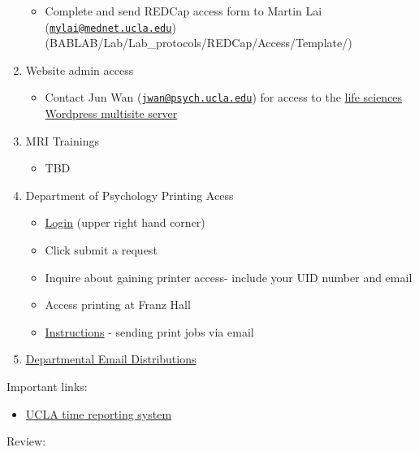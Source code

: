 \documentclass[]{book}
\providecommand{\tightlist}{%
  \setlength{\itemsep}{0pt}\setlength{\parskip}{0pt}}
\begin{document}
\begin{enumerate}
  \begin{itemize}
  \tightlist
  \item
    Complete and send REDCap access form to Martin Lai
    (\href{mailto:mylai@mednet.ucla.edu}{\nolinkurl{mylai@mednet.ucla.edu}})
    (BABLAB/Lab/Lab\_protocols/REDCap/Access/Template/)
  \end{itemize}
\item
  Website admin access

  \begin{itemize}
  \tightlist
  \item
    Contact Jun Wan
    (\href{mailto:jwan@psych.ucla.edu}{\nolinkurl{jwan@psych.ucla.edu}})
    for access to the \href{https://sites.lifesci.ucla.edu/}{life
    sciences Wordpress multisite server}
  \end{itemize}
\item
  MRI Trainings

  \begin{itemize}
  \tightlist
  \item
    TBD
  \end{itemize}
\item
  Department of Psychology Printing Acess

  \begin{itemize}
  \tightlist
  \item
    \href{https://support.lifesci.ucla.edu/hc/en-us}{Login} (upper right
    hand corner)
  \item
    Click submit a request
  \item
    Inquire about gaining printer access- include your UID number and
    email
  \item
    Access printing at Franz Hall
  \item
    \href{https://ucla.app.box.com/s/db0zzvgrydw1yz99yo1nlooq1j4n7jos}{Instructions}
    - sending print jobs via email
  \end{itemize}
\item
  \href{https://ucla.app.box.com/v/Psych-Directory-List}{Departmental
  Email Distributions}
\end{enumerate}

Important links:

\begin{itemize}
\tightlist
\item
  \href{24https://uctrs.it.ucla.edu/}{UCLA time reporting system}
\end{itemize}

Review:
\end{document}
